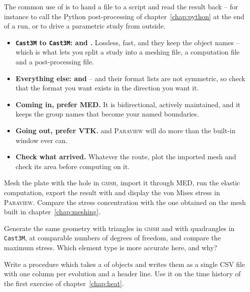 The common use of  is to hand a file to a script and read the result
back -- for instance to call the Python post-processing of
chapter~\ref{chap:python} at the end of a run, or to drive a parametric study
from outside.


\begin{gbox*}
\begin{itemize}
  \item \textbf{\texttt{Cast3M} to \texttt{Cast3M}:  and .}
  Lossless, fast, and they keep the object names -- which is what lets you
  split a study into a meshing file, a computation file and a
  post-processing file.
  \item \textbf{Everything else:  and } -- and their
  format lists are not symmetric, so check that the format you want exists
  in the direction you want it.
  \item \textbf{Coming in, prefer MED.} It is bidirectional, actively
  maintained, and it keeps the group names that become your named
  boundaries.
  \item \textbf{Going out, prefer VTK.}  and
  \textsc{Paraview} will do more than the built-in window ever can.
  \item \textbf{Check what arrived.} Whatever the route, plot the imported
  mesh and check its area before computing on it.
\end{itemize}
\end{gbox*}


 Mesh the plate with the hole in \textsc{gmsh},
  import it through MED, run the elastic computation, export the result with
   and display the von Mises stress in \textsc{Paraview}.
  Compare the stress concentration with the one obtained on the mesh built
  in chapter~\ref{chap:meshing}.

 Generate the same geometry
  with triangles in \textsc{gmsh} and with quadrangles in \texttt{Cast3M}, at
  comparable numbers of degrees of freedom, and compare the maximum stress.
  Which element type is more accurate here, and why?

 Write a procedure
   which takes a  of  objects and
  writes them as a single CSV file with one column per evolution and a header
  line. Use it on the time history of the first exercise of
  chapter~\ref{chap:heat}.

